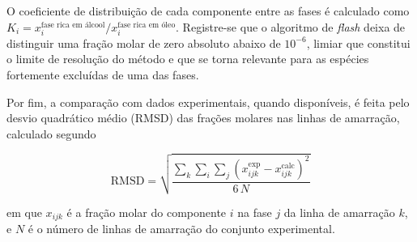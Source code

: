 O coeficiente de distribuição de cada componente entre as fases é calculado como $K_i = x_i^{\text{fase rica em álcool}}/x_i^{\text{fase rica em óleo}}$. Registre-se que o algoritmo de \textit{flash} deixa de distinguir uma fração molar de zero absoluto abaixo de $10^{-6}$, limiar que constitui o limite de resolução do método e que se torna relevante para as espécies fortemente excluídas de uma das fases.
 
Por fim, a comparação com dados experimentais, quando disponíveis, é feita pelo desvio quadrático médio (RMSD) das frações molares nas linhas de amarração, calculado segundo
 
\begin{equation}
    \mathrm{RMSD} = \sqrt{\frac{\sum_{k}\sum_{i}\sum_{j}
    \left(x_{ijk}^{\exp} - x_{ijk}^{\mathrm{calc}}\right)^2}{6\,N}}
    \label{eq:rmsd}
\end{equation}
 
\noindent em que $x_{ijk}$ é a fração molar do componente $i$ na fase $j$ da linha de amarração $k$, e $N$ é o número de linhas de amarração do conjunto experimental.
 